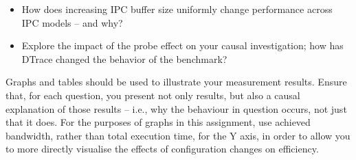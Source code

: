 \documentclass[a4paper,10pt]{article}
\begin{document}
\begin{itemize}
  \item How does increasing IPC buffer size uniformly change performance
    across IPC models -- and why?
  \item Explore the impact of the probe effect on your causal investigation;
    how has DTrace changed the behavior of the benchmark?
\end{itemize}

\noindent
Graphs and tables should be used to illustrate your measurement results.
Ensure that, for each question, you present not only results, but also a
causal explanation of those results -- i.e., why the behaviour in question
occurs, not just that it does.
For the purposes of graphs in this assignment, use achieved bandwidth, rather
than total execution time, for the Y axis, in order to allow you to more
directly visualise the effects of configuration changes on efficiency.
\end{document}
